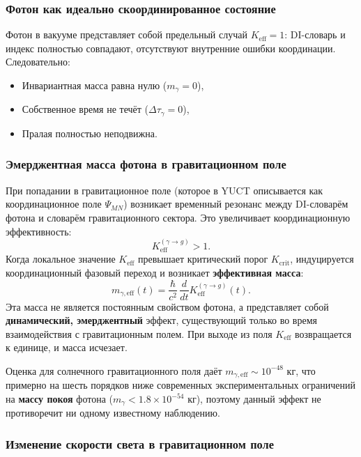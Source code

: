 \documentclass[12pt,a4paper]{article}
\begin{document}
\subsubsection{Фотон как идеально скоординированное состояние}

Фотон в вакууме представляет собой предельный случай $K_{\mathrm{eff}}=1$: DI-словарь и индекс полностью совпадают, отсутствуют внутренние ошибки координации. Следовательно:
\begin{itemize}
	\item Инвариантная масса равна нулю ($m_\gamma=0$),
	\item Собственное время не течёт ($\Delta\tau_\gamma=0$),
	\item Пралая полностью неподвижна.
\end{itemize}

\subsubsection{Эмерджентная масса фотона в гравитационном поле}

При попадании в гравитационное поле (которое в YUCT описывается как координационное поле $\Psi_{MN}$) возникает временный резонанс между DI-словарём фотона и словарём гравитационного сектора. Это увеличивает координационную эффективность:
\begin{equation}
	K_{\mathrm{eff}}^{(\gamma\to g)} > 1.
\end{equation}
Когда локальное значение $K_{\mathrm{eff}}$ превышает критический порог $K_{\mathrm{crit}}$, индуцируется координационный фазовый переход и возникает \textbf{эффективная масса}:
\begin{equation}
	m_{\gamma,\mathrm{eff}}(t) = \frac{\hbar}{c^2}\,\frac{d}{dt}K_{\mathrm{eff}}^{(\gamma\to g)}(t).
\end{equation}
Эта масса не является постоянным свойством фотона, а представляет собой \textbf{динамический, эмерджентный} эффект, существующий только во время взаимодействия с гравитационным полем. При выходе из поля $K_{\mathrm{eff}}$ возвращается к единице, и масса исчезает.

Оценка для солнечного гравитационного поля даёт $m_{\gamma,\mathrm{eff}}\sim 10^{-48}$ кг, что примерно на шесть порядков ниже современных экспериментальных ограничений на \textbf{массу покоя} фотона ($m_\gamma < 1.8\times10^{-54}$ кг), поэтому данный эффект не противоречит ни одному известному наблюдению.

\subsubsection{Изменение скорости света в гравитационном поле}
\end{document}
